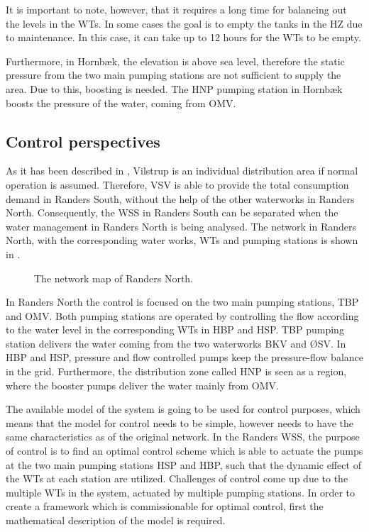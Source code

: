 \vspace{-3mm}
It is important to note, however, that it requires a long time for balancing out the levels in the WTs. In some cases the goal is to empty the tanks in the HZ due to maintenance. In this case, it can take up to 12 hours for the WTs to be empty.  

Furthermore, in Hornbæk, the elevation is above sea level, therefore the static pressure from the two main pumping stations are not sufficient to supply the area. Due to this, boosting is needed. The HNP pumping station in Hornbæk boosts the pressure of the water, coming from OMV. 

\subsection{Control perspectives}
\label{Randers_wss_summary}

As it has been described in , Vilstrup is an individual distribution area if normal operation is assumed. Therefore, VSV is able to provide the total consumption demand in Randers South, without the help of the other waterworks in Randers North. Consequently, the WSS in Randers South can be separated when the water management in Randers North is being analysed. The network in Randers North, with the corresponding water works, WTs and pumping stations is shown in . 

\begin{figure}[H]
\centering

\caption{The network map of Randers North.}
\label{fig:simplified_network}
\end{figure}
\vspace{-3mm}

In Randers North the control is focused on the two main pumping stations, TBP and OMV. Both pumping stations are operated by controlling the flow according to the water level in the corresponding WTs in HBP and HSP. TBP pumping station delivers the water coming from the two waterworks BKV and ØSV. In HBP and HSP, pressure and flow controlled pumps keep the pressure-flow balance in the grid. Furthermore, the distribution zone called HNP is seen as a region, where the booster pumps deliver the water mainly from OMV. 

The available model of the system is going to be used for control purposes, which means that the model for control needs to be simple, however needs to have the same characteristics as of the original network. In the Randers WSS, the purpose of control is to find an optimal control scheme which is able to actuate the pumps at the two main pumping stations HSP and HBP, such that the dynamic effect of the WTs at each station are utilized. Challenges of control come up due to the multiple WTs in the system, actuated by multiple pumping stations. In order to create a framework which is commissionable for optimal control, first the mathematical description of the model is required. 

